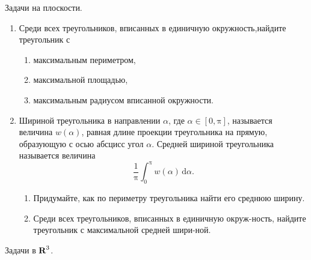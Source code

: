 
\noindent Задачи на плоскости.
\begin{enumerate}
\item Среди всех треугольников, вписанных в единичную окружность,\linebreak  найдите треугольник с
\begin{enumerate}
\item максимальным периметром,
\item максимальной площадью,
\item максимальным радиусом вписанной окружности.
\end{enumerate}
\item Шириной треугольника в направлении $\alpha$, где $\alpha\in[0,\text{π}]$, называется величина $w(\alpha)$, равная длине проекции треугольника на прямую, образующую с осью абсцисс угол $\alpha$. Средней шириной треугольника называется величина
	\[
	\frac{1}{\text{π}}\int_{0}^{\text{π}}w(\alpha)\,\text{d} \alpha.
	\]
\begin{enumerate}
\item Придумайте, как по периметру треугольника найти его среднюю ширину.	
\item Среди всех треугольников, вписанных в единичную окруж-\linebreak ность, найдите треугольник с максимальной средней шири-\linebreak ной.
\end{enumerate}
\end{enumerate}
Задачи в $\text{\bfseries R}^3$.

